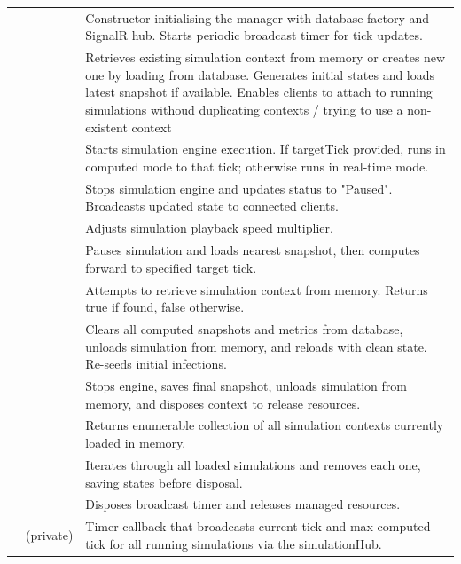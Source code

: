 \begin{longtable}{|L{4cm}|L{4cm}|L{6cm}|}
 & 
 & 
Constructor initialising the manager with database factory and SignalR hub. Starts periodic broadcast timer for tick updates. \\
&  & 
Retrieves existing simulation context from memory or creates new one by loading from database. Generates initial states and loads latest snapshot if available. Enables clients to attach to running simulations withoud duplicating contexts / trying to use a non-existent context \\
&  & 
Starts simulation engine execution. If targetTick provided, runs in computed mode to that tick; otherwise runs in real-time mode. \\
&  & 
Stops simulation engine and updates status to "Paused". Broadcasts updated state to connected clients. \\
&  & 
Adjusts simulation playback speed multiplier. \\
&  & 
Pauses simulation and loads nearest snapshot, then computes forward to specified target tick. \\
&  & 
Attempts to retrieve simulation context from memory. Returns true if found, false otherwise. \\
&  & 
Clears all computed snapshots and metrics from database, unloads simulation from memory, and reloads with clean state. Re-seeds initial infections. \\
&  & 
Stops engine, saves final snapshot, unloads simulation from memory, and disposes context to release resources. \\
&  & 
Returns enumerable collection of all simulation contexts currently loaded in memory. \\
&  & 
Iterates through all loaded simulations and removes each one, saving states before disposal. \\
&  & 
Disposes broadcast timer and releases managed resources. \\
&  (private) & 
Timer callback that broadcasts current tick and max computed tick for all running simulations via the simulationHub. \\
\hline


\end{longtable}
